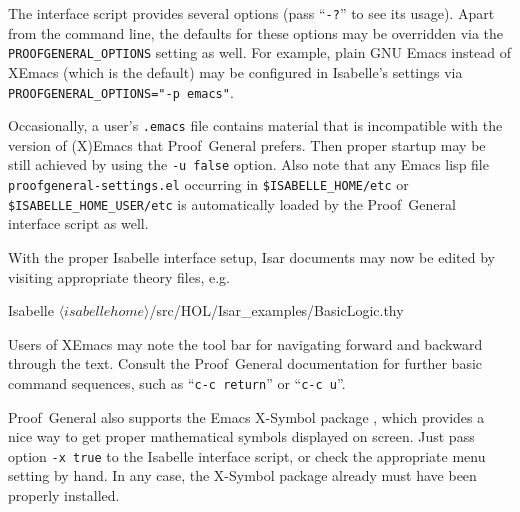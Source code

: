 %
%

The interface script provides several options (pass ``\texttt{-?}'' to see its
usage).  Apart from the command line, the defaults for these options may be
overridden via the \texttt{PROOFGENERAL_OPTIONS} setting as well.  For
example, plain GNU Emacs instead of XEmacs (which is the default) may be
configured in Isabelle's settings via \texttt{PROOFGENERAL_OPTIONS="-p
  emacs"}.

Occasionally, a user's \texttt{.emacs} file contains material that is
incompatible with the version of (X)Emacs that Proof~General prefers.  Then
proper startup may be still achieved by using the \texttt{-u false} option.
Also note that any Emacs lisp file \texttt{proofgeneral-settings.el} occurring
in \texttt{\$ISABELLE_HOME/etc} or \texttt{\$ISABELLE_HOME_USER/etc} is
automatically loaded by the Proof~General interface script as well.

\medskip

With the proper Isabelle interface setup, Isar documents may now be edited by
visiting appropriate theory files, e.g.\ 
\begin{ttbox}
Isabelle \({\langle}isabellehome{\rangle}\)/src/HOL/Isar_examples/BasicLogic.thy
\end{ttbox}
Users of XEmacs may note the tool bar for navigating forward and backward
through the text.  Consult the Proof~General documentation
\cite{proofgeneral,Aspinall:TACAS:2000} for further basic command sequences,
such as ``\texttt{c-c return}'' or ``\texttt{c-c u}''.

\medskip

Proof~General also supports the Emacs X-Symbol package \cite{x-symbol}, which
provides a nice way to get proper mathematical symbols displayed on screen.
Just pass option \texttt{-x true} to the Isabelle interface script, or check
the appropriate menu setting by hand.  In any case, the X-Symbol package
already must have been properly installed.


